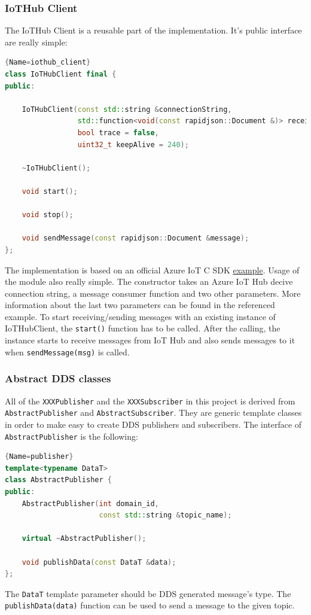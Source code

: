 \documentclass{article}
\begin{document}
\subsubsection{IoTHub Client}

The IoTHub Client is a reusable part of the implementation. It's public interface are really simple:

\begin{lstlisting}[language=C++]{Name=iothub_client}
class IoTHubClient final {
public:

    IoTHubClient(const std::string &connectionString,
                 std::function<void(const rapidjson::Document &)> receivedMessageConsumer, 
                 bool trace = false,
                 uint32_t keepAlive = 240);

    ~IoTHubClient();

    void start();

    void stop();

    void sendMessage(const rapidjson::Document &message);
};
\end{lstlisting}

The implementation is based on an official Azure IoT C SDK \href{https://github.com/Azure/azure-iot-sdk-c/blob/master/iothub_client/samples/iothub_client_sample_amqp/iothub_client_sample_amqp.c}{example}. Usage of the module also really simple. The constructor takes an Azure IoT Hub decive connection string, a message consumer function and two other parameters. More information about the last two parameters can be found in the referenced example. To start receiving/sending messages with an existing instance of IoTHubClient, the \verb+start()+ function has to be called. After the calling, the instance starts to receive messages from IoT Hub and also sends messages to it when \verb+sendMessage(msg)+ is called.

\subsubsection{Abstract DDS classes}

All of the \verb+XXXPublisher+ and the \verb+XXXSubscriber+ in this project is derived from \verb+AbstractPublisher+ and \verb+AbstractSubscriber+. They are generic template classes in order to make easy to create DDS publishers and subscribers. The interface of \verb+AbstractPublisher+ is the following:
\begin{lstlisting}[language=C++]{Name=publisher}
template<typename DataT>
class AbstractPublisher {
public:
    AbstractPublisher(int domain_id,
                      const std::string &topic_name);

    virtual ~AbstractPublisher();

    void publishData(const DataT &data);
};
\end{lstlisting}
The \verb+DataT+ template parameter should be DDS generated message's type. The \verb+publishData(data)+ function can be used to send a message to the given topic.
\end{document}
